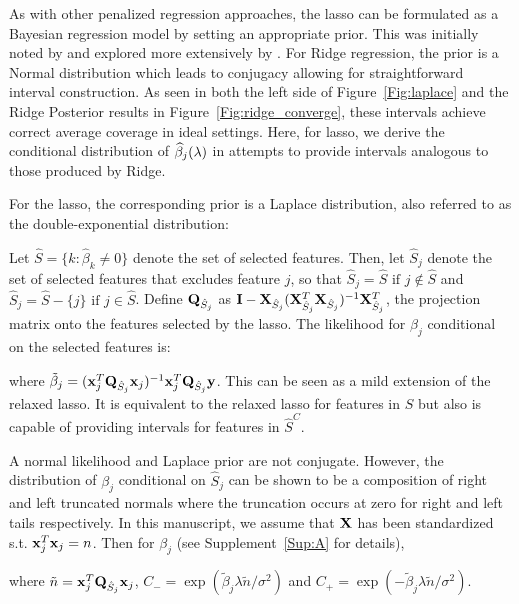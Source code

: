 As with other penalized regression approaches, the lasso can be formulated as a Bayesian regression model by setting an appropriate prior. This was initially noted by \cite{Tibshirani1996} and explored more extensively by \cite{Park2008}.  For Ridge regression, the prior is a Normal distribution which leads to conjugacy allowing for straightforward interval construction. As seen in both the left side of Figure~\ref{Fig:laplace} and the Ridge Posterior results in Figure~\ref{Fig:ridge_converge}, these intervals achieve correct average coverage in ideal settings. Here, for lasso, we derive the conditional distribution of $\widehat{\beta}_j(\lambda)$ in attempts to provide intervals analogous to those produced by Ridge.

For the lasso, the corresponding prior is a Laplace distribution, also referred to as the double-exponential distribution:

Let $\hat{S} = \lbrace k: \hat{\beta}_k \neq  0 \rbrace$ denote the set of selected features. Then, let $\hat{S}_j$ denote the set of selected features that excludes feature $j$, so that $\hat{S}_j = \hat{S} \text{ if } j \notin \hat{S}$ and $\hat{S}_j = \hat{S} - \lbrace j \rbrace \text{ if } j \in \hat{S}$. Define $\mathbf{Q}_{\hat{S}_j}$ as $\mathbf{I} - \mathbf{X}_{\hat{S}_j}(\mathbf{X}_{\hat{S}_j}^T \mathbf{X}_{\hat{S}_j})^{-1} \mathbf{X}_{\hat{S}_j}^T$, the projection matrix onto the features selected by the lasso. The likelihood for $\beta_j$ conditional on the selected features is:


\noindent where $\tilde{\beta}_j = (\mathbf{x}_j^T \mathbf{Q}_{\hat{S}_j} \mathbf{x}_j)^{-1} \mathbf{x}_j^T \mathbf{Q}_{\hat{S}_j} \mathbf{y}$.  This can be seen as a mild extension of the relaxed lasso. It is equivalent to the relaxed lasso for features in $\hat{S}$ but also is capable of providing intervals for features in $\hat{S}^C$.

A normal likelihood and Laplace prior are not conjugate. However, the distribution of $\beta_j$ conditional on $\hat{S}_j $ can be shown to be a composition of right and left truncated normals where the truncation occurs at zero for right and left tails respectively. In this manuscript, we assume that $\mathbf{X}$ has been standardized s.t. $\mathbf{x}_j^T\mathbf{x}_j = n$. Then for $\beta_j$ (see Supplement~\ref{Sup:A} for details),

where $\tilde{n} = \mathbf{x}_j^T \mathbf{Q}_{\hat{S}_j} \mathbf{x}_j$, $C_{-} = \exp(\tilde{\beta}_j \lambda \tilde{n}/\sigma^2)$ and $C_{+} = \exp(-\tilde{\beta}_j \lambda \tilde{n}/\sigma^2)$.

